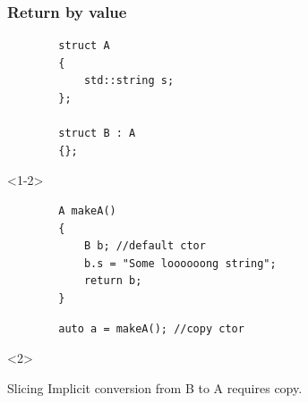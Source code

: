 \documentclass{beamer}
\begin{document}
\begin{frame}[fragile,t]
\frametitle{Return by value}
    \begin{lstlisting}
        struct A
        {
            std::string s;
        };

        struct B : A
        {};
    \end{lstlisting}

    \begin{onlyenv}<1-2>
    \begin{lstlisting}
        A makeA()
        {
            B b; //default ctor
            b.s = "Some loooooong string";
            return b;
        }
    \end{lstlisting}
    \end{onlyenv}
    \begin{lstlisting}
        auto a = makeA(); //copy ctor
    \end{lstlisting}
    
    \begin{onlyenv}<2>
    \begin{alertblock}{Slicing}
        Implicit conversion from B to A requires copy.
    \end{alertblock}
    \end{onlyenv}
\end{frame}
\end{document}
